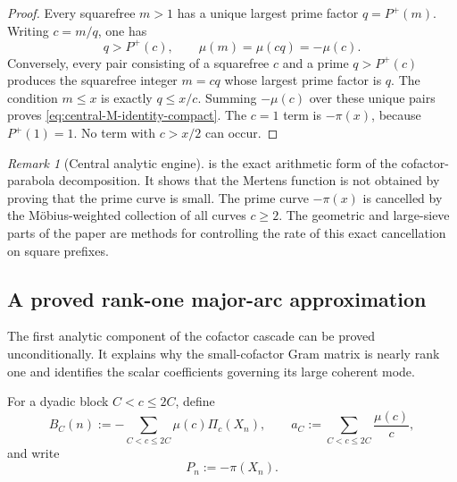 \documentclass[11pt]{article}
\theoremstyle{definition}
\theoremstyle{remark}
\newtheorem{remark}[theorem]{Remark}
\newcommand{\Pplus}{P^{+}}
\newcommand{\1}{\mathbf{1}}
\begin{document}
\begin{proof}
Every squarefree $m>1$ has a unique largest prime factor
$q=\Pplus(m)$.  Writing $c=m/q$, one has
\[
 q>\Pplus(c),
 \qquad
 \mu(m)=\mu(cq)=-\mu(c).
\]
Conversely, every pair consisting of a squarefree $c$ and a prime
$q>\Pplus(c)$ produces the squarefree integer $m=cq$ whose largest
prime factor is $q$.  The condition $m\le x$ is exactly $q\le x/c$.
Summing $-\mu(c)$ over these unique pairs proves
\cref{eq:central-M-identity-compact}.  The $c=1$ term is
$-\pi(x)$, because $\Pplus(1)=1$.  No term with $c>x/2$ can occur.
\end{proof}

\begin{remark}[Central analytic engine]
 is the exact arithmetic form of the
cofactor-parabola decomposition.  It shows that the Mertens function is
not obtained by proving that the prime curve is small.  The prime curve
$-\pi(x)$ is cancelled by the M\"obius-weighted collection of all
curves $c\ge2$.  The geometric and large-sieve parts of the paper are
methods for controlling the rate of this exact cancellation on square
prefixes.
\end{remark}


\subsection{A proved rank-one major-arc approximation}
\label{subsec:major-rank-one}

The first analytic component of the cofactor cascade can be proved
unconditionally.  It explains why the small-cofactor Gram matrix is
nearly rank one and identifies the scalar coefficients governing its
large coherent mode.

For a dyadic block $C<c\le2C$, define
\begin{equation}
 B_C(n)
 :=-\sum_{C<c\le2C}\mu(c)\Pi_c(X_n),
 \qquad
 a_C:=\sum_{C<c\le2C}\frac{\mu(c)}{c},
 \label{eq:block-vector-aC}
\end{equation}
and write
\begin{equation}
 P_n:=-\pi(X_n).
 \label{eq:prime-vector-P}
\end{equation}
\end{document}
